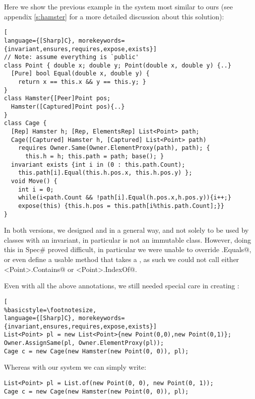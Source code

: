  Here we show the previous example in  the system most similar to ours (see appendix \ref{s:hamster} for a more detailed discussion about this solution):
\begin{lstlisting}[
language={[Sharp]C}, morekeywords={invariant,ensures,requires,expose,exists}]
// Note: assume everything is `public'
class Point { double x; double y; Point(double x, double y) {..}
  [Pure] bool Equal(double x, double y) {
    return x == this.x && y == this.y; }
}
class Hamster{[Peer]Point pos; 
  Hamster([Captured]Point pos){..}
}
class Cage {
  [Rep] Hamster h; [Rep, ElementsRep] List<Point> path;
  Cage([Captured] Hamster h, [Captured] List<Point> path)
    requires Owner.Same(Owner.ElementProxy(path), path); {
      this.h = h; this.path = path; base(); }
  invariant exists {int i in (0 : this.path.Count);
    this.path[i].Equal(this.h.pos.x, this.h.pos.y) };
  void Move() {
    int i = 0;
    while(i<path.Count && !path[i].Equal(h.pos.x,h.pos.y)){i++;}
    expose(this) {this.h.pos = this.path[i%this.path.Count];}}
}
\end{lstlisting}
In both versions, we designed \Q@Point@ and \Q@Hamster@ in a general way, and not solely to be used by classes with an invariant, in particular \Q@Point@ is not an immutable class. However, doing this in Spec\# proved difficult, in particular we were unable to override \Q@Object.Equals@, or even define a usable \Q@equals@ method that takes a \Q@Point@, as such we could not call either \Q@List<Point>.Contains@ or \Q@List<Point>.IndexOf@.
 
Even with all the above annotations, we still needed special care in creating \Q@Cage@s:
\begin{lstlisting}[
%basicstyle=\footnotesize,
language={[Sharp]C}, morekeywords={invariant,ensures,requires,expose,exists}]
List<Point> pl = new List<Point>{new Point(0,0),new Point(0,1)};
Owner.AssignSame(pl, Owner.ElementProxy(pl));
Cage c = new Cage(new Hamster(new Point(0, 0)), pl);
\end{lstlisting}

\noindent Whereas with our system we can simply write:
\begin{lstlisting}
List<Point> pl = List.of(new Point(0, 0), new Point(0, 1));
Cage c = new Cage(new Hamster(new Point(0, 0)), pl);
\end{lstlisting}

